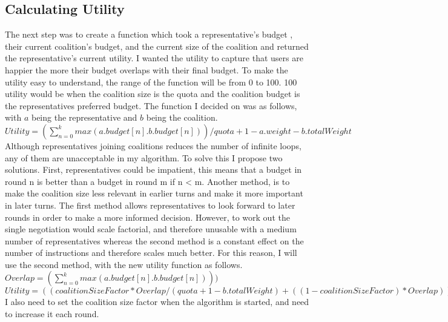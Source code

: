 \subsection{Calculating Utility}
The next step was to create a function which took a representative's budget , their current coalition’s budget, and the current size of the coalition and returned the representative's current utility. I wanted the utility to capture that users are happier the more their budget overlaps with their final budget. To make the utility easy to understand, the range of the function will be from 0 to 100. 100 utility would be when the coalition size is the quota and the coalition budget is the representatives preferred budget. The function I decided on was as follows, with $a$ being the representative and $b$ being the coalition. 
\\ $Utility = (\sum_{n=0}^k  max(a.budget[n].b.budget[n]))/ quota + 1 - a.weight - b.totalWeight$ \\
Although representatives joining coalitions reduces the number of infinite loops, any of them are unacceptable in my algorithm. To solve this I propose two solutions. First, representatives could be impatient, this means that a budget in round n is better than a budget in round m if n < m. Another method, is to make the coalition size less relevant in earlier turns and make it more important in later turns. The first method allows representatives to look forward to later rounds in order to make a more informed decision. However, to work out the single negotiation would scale factorial, and therefore unusable with a medium number of representatives whereas the second method is a constant effect on the number of instructions and therefore scales much better. For this reason, I will use the second method, with the new utility function as follows.  \\
$Overlap =   (\sum_{n=0}^k  max(a.budget[n].b.budget[n])))$ \\
$Utility = ((coalitionSizeFactor * Overlap/ (quota + 1 - b.totalWeight) + ((1-coalitionSizeFactor) * Overlap)))$ \\
I also need to set the coalition size factor when the algorithm is started, and need to increase it each round.
